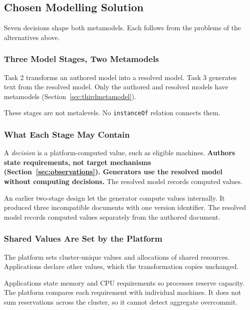 \subsection{Chosen Modelling Solution}
\label{sec:decisions}

Seven decisions shape both metamodels. Each follows from the problems of the
alternatives above.

\subsubsection{Three Model Stages, Two Metamodels}

Task 2 transforms an authored model into a resolved model. Task 3 generates
text from the resolved model. Only the authored and resolved models have
metamodels (Section~\ref{sec:thirdmetamodel}).

These stages are not metalevels. No \texttt{instanceOf} relation connects them.

\subsubsection{What Each Stage May Contain}
\label{sec:stagecontent}

A \emph{decision} is a platform-computed value, such as eligible machines.
\textbf{Authors state requirements, not target mechanisms
(Section~\ref{sec:observations}). Generators use the resolved model without
computing decisions.} The resolved model records computed values.

An earlier two-stage design let the generator compute values internally. It
produced three incompatible documents with one version identifier. The resolved
model records computed values separately from the authored document.

\subsubsection{Shared Values Are Set by the Platform}
\label{sec:sharedvalues}

The platform sets cluster-unique values and allocations of shared resources.
Applications declare other values, which the transformation copies unchanged.

Applications state memory and CPU requirements so processes reserve capacity.
The platform compares each requirement with individual machines. It does not
sum reservations across the cluster, so it cannot detect aggregate overcommit.

